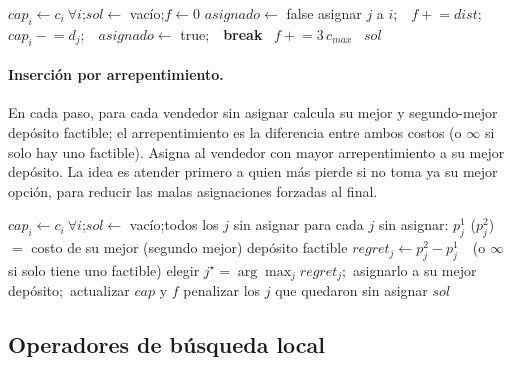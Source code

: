 \documentclass[11pt,a4paper]{article}
\begin{document}
\begin{algorithm}[H]
\caption{Heurística constructiva: vecino más cercano}
\begin{algorithmic}[1]
  \State $cap_i \gets c_i\ \forall i$;\quad $sol \gets$ vacío;\quad $f \gets 0$
    \State $asignado \gets$ false
        \State asignar $j$ a $i$;\ \ $f \mathrel{+}= dist$;\ \ $cap_i \mathrel{-}= d_j$;\ \ $asignado\gets$ true;\ \ \textbf{break}
      \EndIf
    \EndFor
    \ $f \mathrel{+}= 3\,c_{max}$\ \EndIf
  \EndFor
  \State \Return $sol$
\EndFunction
\end{algorithmic}
\end{algorithm}

\paragraph{Inserción por arrepentimiento.} En cada paso, para cada vendedor sin
asignar calcula su mejor y segundo-mejor depósito factible; el arrepentimiento es la diferencia
entre ambos costos (o $\infty$ si solo hay uno factible). Asigna al vendedor con mayor arrepentimiento a
su mejor depósito. La idea es atender primero a quien más pierde si no toma ya su mejor opción,
para reducir las malas asignaciones forzadas al final.

\begin{algorithm}[H]
\caption{Heurística constructiva: inserción por arrepentimiento}
\begin{algorithmic}[1]
  \State $cap_i \gets c_i\ \forall i$;\quad $sol \gets$ vacío;\quad todos los $j$ sin asignar
    \State para cada $j$ sin asignar: $p^1_j$ ($p^2_j$) $=$ costo de su mejor (segundo mejor) depósito factible
    \State $regret_j \gets p^2_j - p^1_j$\ \ (o $\infty$ si solo tiene uno factible)
    \State elegir $j^\star = \arg\max_j regret_j$;\ asignarlo a su mejor depósito;\ actualizar $cap$ y $f$
  \EndWhile
  \State penalizar los $j$ que quedaron sin asignar
  \State \Return $sol$
\EndFunction
\end{algorithmic}
\end{algorithm}

\subsection{Operadores de búsqueda local}
\end{document}
